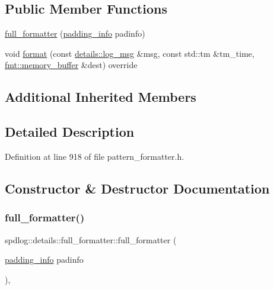 \subsection*{Public Member Functions}
\begin{DoxyCompactItemize}
\item 
\hyperlink{classspdlog_1_1details_1_1full__formatter_ac0212ed0f1efbb64726ddd73b62b20a0}{full\+\_\+formatter} (\hyperlink{structspdlog_1_1details_1_1padding__info}{padding\+\_\+info} padinfo)
\item 
void \hyperlink{classspdlog_1_1details_1_1full__formatter_a11da1d2ec8378841d228df071915da35}{format} (const \hyperlink{structspdlog_1_1details_1_1log__msg}{details\+::log\+\_\+msg} \&msg, const std\+::tm \&tm\+\_\+time, \hyperlink{format_8h_a21cbf729f69302f578e6db21c5e9e0d2}{fmt\+::memory\+\_\+buffer} \&dest) override
\end{DoxyCompactItemize}
\subsection*{Additional Inherited Members}


\subsection{Detailed Description}


Definition at line 918 of file pattern\+\_\+formatter.\+h.



\subsection{Constructor \& Destructor Documentation}
\mbox{\label{classspdlog_1_1details_1_1full__formatter_ac0212ed0f1efbb64726ddd73b62b20a0}} 
\subsubsection{\texorpdfstring{full\+\_\+formatter()}{full\_formatter()}}
{\footnotesize\ttfamily spdlog\+::details\+::full\+\_\+formatter\+::full\+\_\+formatter (\begin{DoxyParamCaption}\item[{\hyperlink{structspdlog_1_1details_1_1padding__info}{padding\+\_\+info}}]{padinfo }\end{DoxyParamCaption})\hspace{0.3cm}{\ttfamily [inline]}, {\ttfamily [explicit]}}



